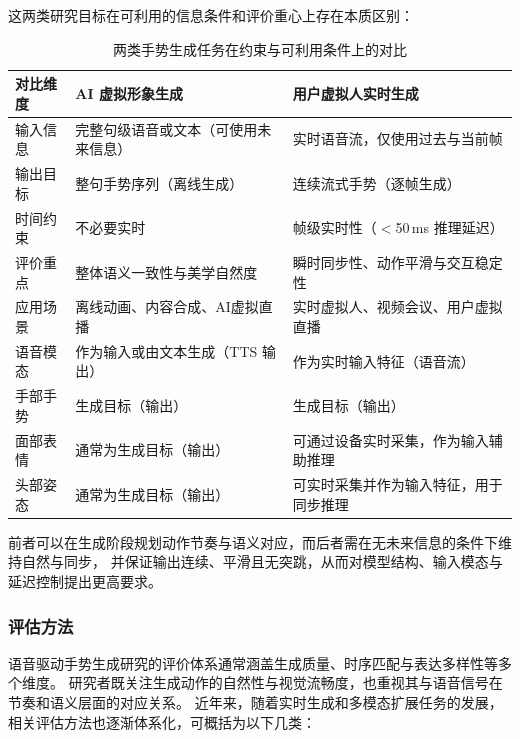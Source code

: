 这两类研究目标在可利用的信息条件和评价重心上存在本质区别：

\begin{table}[h]
\centering
\caption{两类手势生成任务在约束与可利用条件上的对比}
\label{tab:task_constraint_comparison}
\begin{tabular}{@{}p{3cm}p{5.5cm}p{5.5cm}@{}}
\toprule
\textbf{对比维度} & \textbf{AI 虚拟形象生成} & \textbf{用户虚拟人实时生成} \\ 
\midrule
输入信息 & 完整句级语音或文本（可使用未来信息） & 实时语音流，仅使用过去与当前帧 \\ 
输出目标 & 整句手势序列（离线生成） & 连续流式手势（逐帧生成） \\ 
时间约束 & 不必要实时 & 帧级实时性（$<$50\,ms 推理延迟） \\ 
评价重点 & 整体语义一致性与美学自然度 & 瞬时同步性、动作平滑与交互稳定性 \\ 
应用场景 & 离线动画、内容合成、AI虚拟直播 & 实时虚拟人、视频会议、用户虚拟直播 \\ 
\midrule
语音模态 & 作为输入或由文本生成（TTS 输出） & 作为实时输入特征（语音流） \\ 
手部手势 & 生成目标（输出） & 生成目标（输出） \\ 
面部表情 & 通常为生成目标（输出） & 可通过设备实时采集，作为输入辅助推理 \\ 
头部姿态 & 通常为生成目标（输出） & 可实时采集并作为输入特征，用于同步推理 \\ 
\bottomrule
\end{tabular}
\end{table}

前者可以在生成阶段规划动作节奏与语义对应，而后者需在无未来信息的条件下维持自然与同步，
并保证输出连续、平滑且无突跳，从而对模型结构、输入模态与延迟控制提出更高要求。

\subsubsection{评估方法}

语音驱动手势生成研究的评价体系通常涵盖生成质量、时序匹配与表达多样性等多个维度。
研究者既关注生成动作的自然性与视觉流畅度，也重视其与语音信号在节奏和语义层面的对应关系。
近年来，随着实时生成和多模态扩展任务的发展，相关评估方法也逐渐体系化，可概括为以下几类：


